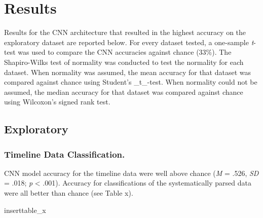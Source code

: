 \section{Results}

Results for the CNN architecture that resulted in the highest accuracy on the exploratory dataset are reported below. For every dataset tested, a one-sample \textit{t}-test was used to compare the CNN accuracies against chance (33\%). The Shapiro-Wilks test of normality was conducted to test the normality for each dataset. When normality was assumed, the mean accuracy for that dataset was compared against chance using Student's _t_-test. When normality could not be assumed, the median accuracy for that dataset was compared against chance using Wilcoxon's signed rank test. 


\subsection{Exploratory}
\subsubsection{Timeline Data Classification.}
CNN model accuracy for the timeline data were well above chance (\textit{M} = .526, \textit{SD} = .018; \textit{p} < .001). Accuracy for classifications of the systematically parsed data were all better than chance (see Table x).

insert{table_x} %


